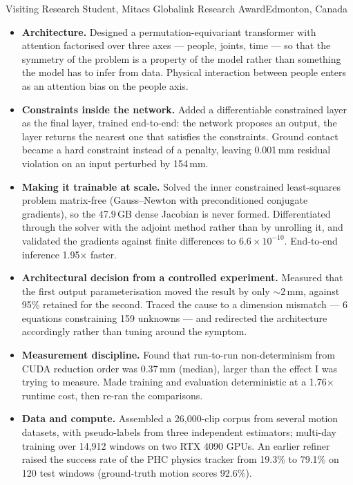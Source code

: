 %
{Visiting Research Student, Mitacs Globalink Research Award}{Edmonton, Canada}
\begin{itemize}
    \item \textbf{Architecture.} Designed a permutation-equivariant transformer with attention factorised over three axes --- people, joints, time --- so that the symmetry of the problem is a property of the model rather than something the model has to infer from data. Physical interaction between people enters as an attention bias on the people axis.
    \item \textbf{Constraints inside the network.} Added a differentiable constrained layer as the final layer, trained end-to-end: the network proposes an output, the layer returns the nearest one that satisfies the constraints. Ground contact became a hard constraint instead of a penalty, leaving 0.001\,mm residual violation on an input perturbed by 154\,mm.
    \item \textbf{Making it trainable at scale.} Solved the inner constrained least-squares problem matrix-free (Gauss--Newton with preconditioned conjugate gradients), so the 47.9\,GB dense Jacobian is never formed. Differentiated through the solver with the adjoint method rather than by unrolling it, and validated the gradients against finite differences to $6.6\times10^{-10}$. End-to-end inference 1.95$\times$ faster.
    \item \textbf{Architectural decision from a controlled experiment.} Measured that the first output parameterisation moved the result by only $\sim$2\,mm, against 95\% retained for the second. Traced the cause to a dimension mismatch --- 6 equations constraining 159 unknowns --- and redirected the architecture accordingly rather than tuning around the symptom.
    \item \textbf{Measurement discipline.} Found that run-to-run non-determinism from CUDA reduction order was 0.37\,mm (median), larger than the effect I was trying to measure. Made training and evaluation deterministic at a 1.76$\times$ runtime cost, then re-ran the comparisons.
    \item \textbf{Data and compute.} Assembled a 26,000-clip corpus from several motion datasets, with pseudo-labels from three independent estimators; multi-day training over 14,912 windows on two RTX 4090 GPUs. An earlier refiner raised the success rate of the PHC physics tracker from 19.3\% to 79.1\% on 120 test windows (ground-truth motion scores 92.6\%).
\end{itemize}

